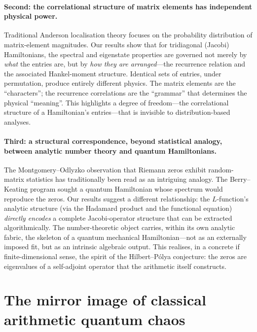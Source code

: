 \documentclass[aps,prx,reprint,floatfix]{revtex4-2}
\begin{document}
\paragraph{Second: the correlational structure of matrix elements has
independent physical power.}
Traditional Anderson localisation theory focuses on the probability
distribution of matrix-element magnitudes. Our results show that for
tridiagonal (Jacobi) Hamiltonians, the spectral and eigenstate properties
are governed not merely by \emph{what} the entries are, but by \emph{how
they are arranged}---the recurrence relation and the associated Hankel-moment
structure. Identical sets of entries, under permutation, produce entirely
different physics. The matrix elements are the ``characters''; the recurrence
correlations are the ``grammar'' that determines the physical ``meaning''.
This highlights a degree of freedom---the correlational structure of a
Hamiltonian's entries---that is invisible to distribution-based analyses.

\paragraph{Third: a structural correspondence, beyond statistical analogy,
between analytic number theory and quantum Hamiltonians.}
The Montgomery--Odlyzko observation that Riemann zeros exhibit random-matrix
statistics has traditionally been read as an intriguing analogy. The Berry--Keating
program sought a quantum Hamiltonian whose spectrum would reproduce the
zeros. Our results suggest a different relationship: the $L$-function's
analytic structure (via the Hadamard product and the functional equation)
\emph{directly encodes} a complete Jacobi-operator structure that can be
extracted algorithmically. The number-theoretic object carries, within its
own analytic fabric, the skeleton of a quantum mechanical Hamiltonian---not
as an externally imposed fit, but as an intrinsic algebraic output. This
realises, in a concrete if finite-dimensional sense, the spirit of the
Hilbert--P\'olya conjecture: the zeros are eigenvalues of a self-adjoint
operator that the arithmetic itself constructs.

\section{The mirror image of classical arithmetic quantum chaos}
\label{sec:mirror}
\end{document}
